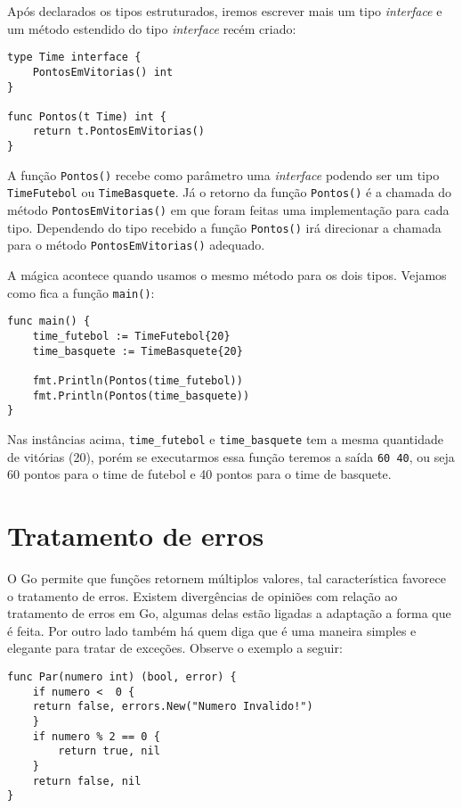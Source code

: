 \documentclass{SBCbookchapter}
\begin{document}
Após declarados os tipos estruturados, iremos escrever mais um tipo \textit{interface} e um método estendido do tipo \textit{interface} recém criado:

\begin{lstlisting}
type Time interface {
	PontosEmVitorias() int
}

func Pontos(t Time) int {
	return t.PontosEmVitorias()
}
\end{lstlisting}

A função \texttt{Pontos()} recebe como parâmetro uma \textit{interface} podendo ser um tipo \texttt{TimeFutebol} ou \texttt{TimeBasquete}. Já o retorno da função \texttt{Pontos()} é a chamada do método \texttt{PontosEmVitorias()} em que foram feitas uma implementação para cada tipo. Dependendo do tipo recebido a função \texttt{Pontos()} irá direcionar a chamada para o método \texttt{PontosEmVitorias()} adequado.

A mágica acontece quando usamos o mesmo método para os dois tipos. Vejamos como fica a função \texttt{main()}:

\begin{lstlisting}
func main() {
	time_futebol := TimeFutebol{20}
	time_basquete := TimeBasquete{20}
	
	fmt.Println(Pontos(time_futebol))
	fmt.Println(Pontos(time_basquete))
}
\end{lstlisting}

\label{duck}

Nas instâncias acima, \texttt{time\_futebol} e \texttt{time\_basquete} tem a mesma quantidade de vitórias (20), porém se executarmos essa função teremos a saída \texttt{60 40}, ou seja 60 pontos para o time de futebol e 40 pontos para o time de basquete.



\section{Tratamento de erros}

O Go permite que funções retornem múltiplos valores, tal característica favorece o tratamento de erros. Existem divergências de opiniões com relação ao tratamento de erros em Go, algumas delas estão ligadas a adaptação a forma que é feita. Por outro lado também há quem diga que é uma maneira simples e elegante para tratar de exceções. Observe o exemplo a seguir:

\begin{lstlisting}
func Par(numero int) (bool, error) {
    if numero <  0 {
	return false, errors.New("Numero Invalido!")
    }
    if numero % 2 == 0 {
        return true, nil
    }
    return false, nil
}
\end{lstlisting}
\end{document}
